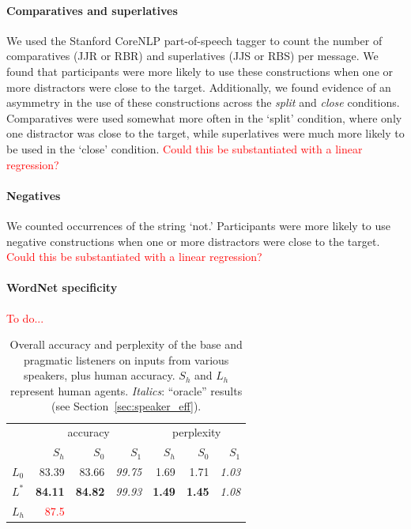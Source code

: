 \documentclass[11pt,letterpaper]{article}
\newcommand{\Listener}{L}
\newcommand{\Speaker}{S}
\renewcommand{\|}{\mid}
\newcommand{\best}[1]{\textbf{#1}}
\newcommand{\oracle}[1]{\textit{#1}}
\newcommand{\secref}[1]{Section~\ref{#1}}
\newcommand{\todocheck}[1]{\textcolor{red}{#1}}
\begin{document}
\paragraph{Comparatives and superlatives} We used the Stanford CoreNLP part-of-speech tagger \cite{Toutanova2003} to count the number of comparatives (JJR or RBR) and superlatives (JJS or RBS) per message. We found that participants were more likely to use these constructions when one or more distractors were close to the target. Additionally, we found evidence of an asymmetry in the use of these constructions across the \emph{split} and \emph{close} conditions. Comparatives were used somewhat more often in the `split' condition, where only one distractor was close to the target, while superlatives were much more likely to be used in the `close' condition.
\todocheck{Could this be substantiated with a linear regression?}

\paragraph{Negatives} We counted occurrences of the string `not.' Participants were more likely to use negative constructions when one or more distractors were close to the target.
\todocheck{Could this be substantiated with a linear regression?}

\paragraph{WordNet specificity} \todocheck{To do...} \cite{Fellbaum1998}

\begin{table}[t]
\centering
\begin{tabular}{lrrrrrr}
  \toprule
   & \multicolumn{3}{c}{accuracy} & \multicolumn{3}{c}{perplexity} \\
   & $\Speaker_h$ & $\Speaker_0$ & $\Speaker_1$ & $\Speaker_h$ & $\Speaker_0$ & $\Speaker_1$ \\
  \midrule
  $\Listener_0$ & 83.39 & 83.66 & \oracle{99.75} & 1.69 & 1.71 & \oracle{1.03} \\
  $\Listener^*$ & \best{84.11} & \best{84.82} & \oracle{99.93} & \best{1.49} & \best{1.45} & \oracle{1.08}
  \\[0.5ex]
  $\Listener_h$ & \todocheck{87.5} \\
   \bottomrule
\end{tabular}
\caption{Overall accuracy and perplexity of the base and pragmatic listeners
on inputs from various speakers, plus human accuracy. $\Speaker_h$ and $\Listener_h$
represent human agents. \oracle{Italics}: ``oracle'' results (see \secref{sec:speaker_eff}).}
\label{table:speakerVsListener}
\end{table}
\end{document}
